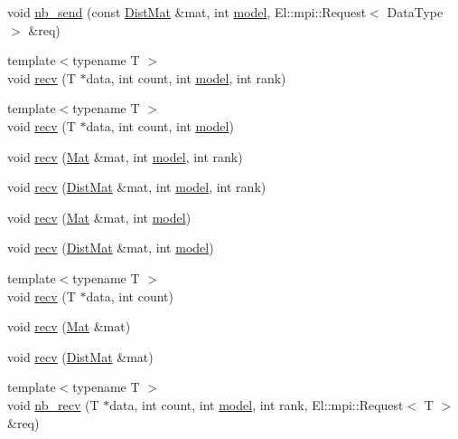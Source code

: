 \begin{DoxyCompactItemize}
\item 
void \hyperlink{classlbann_1_1lbann__comm_a1144c161ccc147d879d088b5832d64a7}{nb\+\_\+send} (const \hyperlink{base_8hpp_a0fab5387556805cfeac3e7e567bf66c5}{Dist\+Mat} \&mat, int \hyperlink{classlbann_1_1model}{model}, El\+::mpi\+::\+Request$<$ Data\+Type $>$ \&req)
\item 
{\footnotesize template$<$typename T $>$ }\\void \hyperlink{classlbann_1_1lbann__comm_af8842cd4cea390f76d9146e1c4578de4}{recv} (T $\ast$data, int count, int \hyperlink{classlbann_1_1model}{model}, int rank)
\item 
{\footnotesize template$<$typename T $>$ }\\void \hyperlink{classlbann_1_1lbann__comm_a7f2f06772bdee76b4d736c1d7ab84329}{recv} (T $\ast$data, int count, int \hyperlink{classlbann_1_1model}{model})
\item 
void \hyperlink{classlbann_1_1lbann__comm_ac1ed8dd7b6f839b69bfb33f88728b18d}{recv} (\hyperlink{base_8hpp_a68f11fdc31b62516cb310831bbe54d73}{Mat} \&mat, int \hyperlink{classlbann_1_1model}{model}, int rank)
\item 
void \hyperlink{classlbann_1_1lbann__comm_a1376b4f3c0941e19ff23a8baf30eb63d}{recv} (\hyperlink{base_8hpp_a0fab5387556805cfeac3e7e567bf66c5}{Dist\+Mat} \&mat, int \hyperlink{classlbann_1_1model}{model}, int rank)
\item 
void \hyperlink{classlbann_1_1lbann__comm_a6b1ecfe900346c0996fb8066e4f76fe2}{recv} (\hyperlink{base_8hpp_a68f11fdc31b62516cb310831bbe54d73}{Mat} \&mat, int \hyperlink{classlbann_1_1model}{model})
\item 
void \hyperlink{classlbann_1_1lbann__comm_a018f0451e2a984d28b6a1f099cf9d421}{recv} (\hyperlink{base_8hpp_a0fab5387556805cfeac3e7e567bf66c5}{Dist\+Mat} \&mat, int \hyperlink{classlbann_1_1model}{model})
\item 
{\footnotesize template$<$typename T $>$ }\\void \hyperlink{classlbann_1_1lbann__comm_ab96fe808a236d41ecd05c0cc2461dba0}{recv} (T $\ast$data, int count)
\item 
void \hyperlink{classlbann_1_1lbann__comm_a3d0cca55711c9c9913f3d940c5bba4eb}{recv} (\hyperlink{base_8hpp_a68f11fdc31b62516cb310831bbe54d73}{Mat} \&mat)
\item 
void \hyperlink{classlbann_1_1lbann__comm_acc92b86b30287689870e018b062076f8}{recv} (\hyperlink{base_8hpp_a0fab5387556805cfeac3e7e567bf66c5}{Dist\+Mat} \&mat)
\item 
{\footnotesize template$<$typename T $>$ }\\void \hyperlink{classlbann_1_1lbann__comm_aac24e8802602c73efddb455274e158f4}{nb\+\_\+recv} (T $\ast$data, int count, int \hyperlink{classlbann_1_1model}{model}, int rank, El\+::mpi\+::\+Request$<$ T $>$ \&req)

\end{DoxyCompactItemize}
